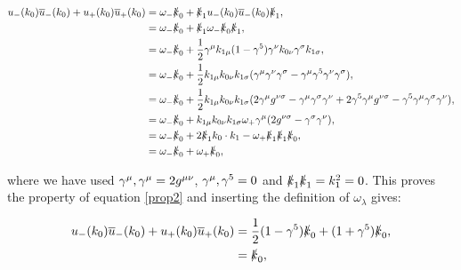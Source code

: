 	\begin{subequations}
	\begin{align*}
		u_-(k_0)\overline{u}_-(k_0) + u_+(k_0)\overline{u}_+(k_0) &= \omega_-\slashed k_0 + \slashed k_1 u_-(k_0)\overline{u}_-(k_0)\slashed k_1,\\
	                                                                  &= \omega_-\slashed k_0 + \slashed k_1 \omega_-\slashed k_0\slashed k_1,\\
	                                                                  &= \omega_-\slashed k_0 + \frac{1}{2}\gamma^{\mu}k_{1\mu}(1-\gamma^{5})\gamma^{\nu}k_{0\nu}\gamma^{\sigma}k_{1\sigma},\\
	                                                                  &= \omega_-\slashed k_0 + \frac{1}{2} k_{1\mu}k_{0\nu}k_{1\sigma}(\gamma^{\mu}\gamma^{\nu}\gamma^{\sigma}-\gamma^{\mu}\gamma^{5}\gamma^{\nu}\gamma^{\sigma}),\\
	                                                                  &= \omega_-\slashed k_0 + \frac{1}{2} k_{1\mu}k_{0\nu}k_{1\sigma}(2\gamma^{\mu}g^{\nu\sigma} - \gamma^{\mu}\gamma^{\sigma}\gamma^{\nu}+2\gamma^{5}\gamma^{\mu}g^{\nu\sigma} - \gamma^{5}\gamma^{\mu}\gamma^{\sigma}\gamma^{\nu}),\\
	                                                                  &= \omega_-\slashed k_0 + k_{1\mu}k_{0\nu}k_{1\sigma}\omega_+\gamma^{\mu}(2g^{\nu\sigma} - \gamma^{\sigma}\gamma^{\nu}),\\
	                                                                  &= \omega_-\slashed k_0 + 2\slashed k_1 k_0\cdot k_1 - \omega_+\slashed k_1\slashed k_1 \slashed k_0,\\
	                                                                  &= \omega_-\slashed k_0 + \omega_+\slashed k_0,
	\end{align*}
	\end{subequations}

	where we have used ${\gamma^{\mu}, \gamma^{\mu}}=2g^{\mu\nu}$, ${\gamma^{\mu}, \gamma^{5}}=0$ and $\slashed k_1\slashed k_1=k_1^2=0$.  This proves the property of equation \ref{prop2} and inserting the definition of $\omega_\lambda$ gives:

	\begin{subequations}
	\begin{align*}
		u_-(k_0)\overline{u}_-(k_0) + u_+(k_0)\overline{u}_+(k_0) &= \frac{1}{2}(1-\gamma^{5})\slashed k_0 + (1+\gamma^{5})\slashed k_0,\\
		                                                          &= \slashed k_0,
	\end{align*}
	\end{subequations}

